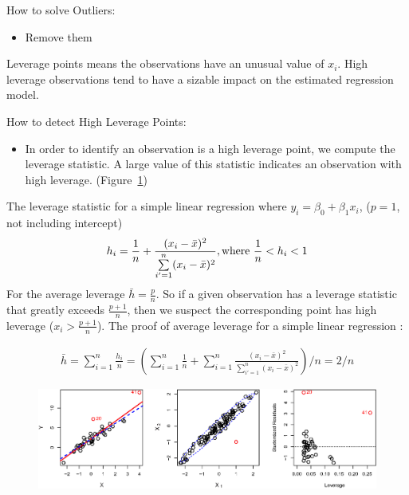 \documentclass[12pt,a4paper]{article}%
\theoremstyle{definition}
\theoremstyle{plain}
\numberwithin{equation}{section}
\newcounter{subsubsubsection}[subsubsection]
\begin{document}
How to solve Outliers:
\begin{itemize}
\item Remove them
\end{itemize}
\subsubsubsection{\color{blue}{High Leverage Points}}
Leverage points means the observations have an unusual value of $x_{i}$. 
High leverage observations tend to have a sizable impact on the estimated regression model.

How to detect High Leverage Points:
\begin{itemize}
\item In order to identify an observation is a high leverage point, we compute the leverage statistic. 
A large value of this statistic indicates an observation with high leverage. (Figure~\ref{figure-3.13})
\end{itemize}
The leverage statistic for a simple linear regression where $y_{i} = \beta_{0} + \beta_{1}x_{i}$, ($p=1$, not including intercept)
\begin{gather}
h_{i} = \frac{1}{n} + \frac{(x_{i}-\bar{x})^{2}}{\sum\limits_{i'=1}^{n}(x_{i}-\bar{x})^{2}},{\rm where~} \frac{1}{n}<h_{i}<1
\end{gather}
For the average leverage $ \bar{h}= \frac{p}{n}$. So if a given observation has a leverage statistic that greatly exceeds $\frac{p+1}{n}$, then we suspect the corresponding point has high leverage ($x_{i}>\frac{p+1}{n} $). 
The proof of average leverage for a simple linear regression :

\begin{gather}
\bar{h} = \sum\limits_{i=1}^{n}\frac{h_{i}}{n} = \left(\sum\limits_{i=1}^{n} \frac{1}{n} + \sum\limits_{i=1}^{n} \frac{(x_{i}-\bar{x})^{2}}{\sum\limits_{i'=1}^{n}(x_{i}-\bar{x})^{2}}\right)/n = 2/n 
\end{gather}

\begin{figure}[H]
\centering
\includegraphics[scale=0.85]{images//3_13.eps}
\\~\\
\caption{}\label{figure-3.13}
\end{figure}
\end{document}
